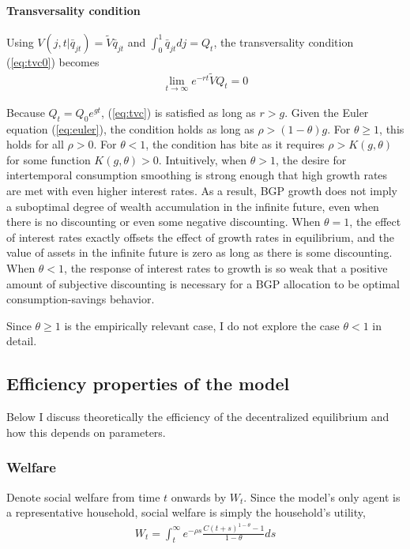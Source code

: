 \documentclass[11pt,english]{article}
\begin{document}
\paragraph{Transversality condition}

Using $V(j,t|\bar{q}_{jt}) = \tilde{V} \bar{q}_{jt}$ and $\int_0^1 \bar{q}_{jt} dj = Q_t$, the transversality condition (\ref{eq:tvc0}) becomes
\begin{align}
	\lim_{t \to \infty} e^{-rt} \tilde{V} Q_t = 0 \label{eq:tvc}
\end{align}

Because $Q_t = Q_0 e^{gt}$, (\ref{eq:tvc}) is satisfied as long as $r > g$. Given the Euler equation (\ref{eq:euler}), the condition holds as long as $\rho > (1-\theta)g$.  For $\theta \ge 1$, this holds for all $\rho > 0$.  For $\theta < 1$, the condition has bite as it requires $\rho > K(g,\theta)$ for some function $K(g,\theta) > 0$. Intuitively, when $\theta > 1$, the desire for intertemporal consumption smoothing is strong enough that high growth rates are met with even higher interest rates. As a result, BGP growth does not imply a suboptimal degree of wealth accumulation in the infinite future, even when there is no discounting or even some negative discounting. When $\theta = 1$, the effect of interest rates exactly offsets the effect of growth rates in equilibrium, and the value of assets in the infinite future is zero as long as there is some discounting. When $\theta < 1$, the response of interest rates to growth is so weak that a positive amount of subjective discounting is necessary for a BGP allocation to be optimal consumption-savings behavior.

Since $\theta \ge 1$ is the empirically relevant case, I do not explore the case $\theta < 1$ in detail.

\subsection{Efficiency properties of the model}

Below I discuss theoretically the efficiency of the decentralized equilibrium and how this depends on parameters. 

\subsubsection{Welfare}

Denote social welfare from time $t$ onwards by $W_t$. Since the model's only agent is a representative household, social welfare is simply the household's utility,
\begin{align}
	W_t = \int_t^{\infty} e^{-\rho s} \frac{C(t+s)^{1-\theta} - 1}{1-\theta} ds
\end{align}
\end{document}
